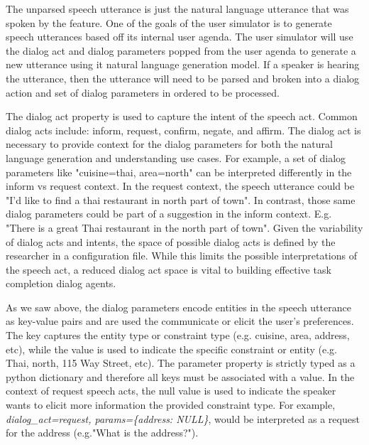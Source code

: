 The unparsed speech utterance is just the natural language utterance that was spoken by the feature. One of the goals of the user simulator is to generate speech utterances based off its internal user agenda. The user simulator will use the dialog act and dialog parameters popped from the user agenda to generate a new utterance using it natural language generation model. If a speaker is hearing the utterance, then the utterance will need to be parsed and broken into a dialog action and set of dialog parameters in ordered to be processed. 

The dialog act property is used to capture the intent of the speech act. Common dialog acts include: inform, request, confirm, negate, and affirm. The dialog act is necessary to provide context for the dialog parameters for both the natural language generation and understanding use cases. For example, a set of dialog parameters like "{cuisine=thai, area=north}" can be interpreted differently in the inform vs request context. In the request context, the speech utterance could be "I'd like to find a thai restaurant in north part of town". In contrast, those same dialog parameters could be part of a suggestion in the inform context. E.g. "There is a great Thai restaurant in the north part of town". Given the variability of dialog acts and intents, the space of possible dialog acts is defined by the researcher in a configuration file. While this limits the possible interpretations of the speech act, a reduced dialog act space is vital to building effective task completion dialog agents.  

As we saw above, the dialog parameters encode entities in the speech utterance as key-value pairs and are used the communicate  or elicit the user's preferences. The key captures the entity type or constraint type (e.g. cuisine, area, address, etc), while the value is used to indicate the specific constraint or entity (e.g. Thai, north, 115 Way Street, etc). The parameter property is strictly typed as a python dictionary and therefore all keys must be associated with a value. In the context of request speech acts, the null value is used to indicate the speaker wants to elicit more information the provided constraint type. For example, \textit{dialog\_act=request, params=\{address: NULL\}}, would be interpreted as a request for the address (e.g."What is the address?"). 


